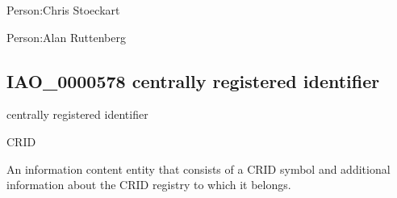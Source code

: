 \documentclass[letterpaper,10pt,english]{sphinxmanual}
\begin{document}
\begin{sphinxShadowBox}

\sphinxAtStartPar
{}
\end{sphinxShadowBox}

\begin{sphinxShadowBox}

\sphinxAtStartPar
Person:Chris Stoeckart

\sphinxAtStartPar
Person:Alan Ruttenberg
\end{sphinxShadowBox}
\begin{quote}

\ignorespaces \end{quote}


\subsection{IAO\_0000578 \sphinxhyphen{} centrally registered identifier}
\label{\detokenize{doc-IAO_0000578:iao-0000578-centrally-registered-identifier}}\label{\detokenize{doc-IAO_0000578:index-0}}\label{\detokenize{doc-IAO_0000578::doc}}
\begin{sphinxShadowBox}

\sphinxAtStartPar
centrally registered identifier
\end{sphinxShadowBox}

\begin{sphinxShadowBox}

\sphinxAtStartPar
CRID
\end{sphinxShadowBox}

\begin{sphinxShadowBox}

\sphinxAtStartPar
{\hyperref[\detokenize{doc-IAO_0020000::doc}]{}}
\end{sphinxShadowBox}

\begin{sphinxShadowBox}

\sphinxAtStartPar
An information content entity that consists of a CRID symbol and additional information about the CRID registry to which it belongs.
\end{sphinxShadowBox}
\end{document}
